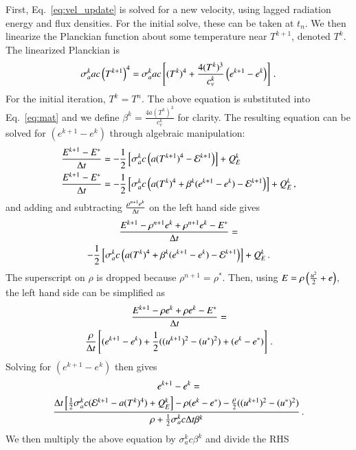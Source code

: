First, Eq.~\eqref{eq:vel_update} is solved for a new velocity, using lagged
radiation energy and flux densities.  For the initial solve, these can be taken
at $t_n$.  We then linearize the Planckian function about some temperature near
$T^{k+1}$, denoted $T^k$. The linearized Planckian is
\begin{equation}
  \sigma_a^k a c \left( T^{k+1} \right)^4 = 
  \sigma_a^k a c \left[(T^k)^4 + \frac{4(T^k)^3}{c_v^k}\left(
  e^{k+1} - e^{k}  \right)\right] \, .
    \label{eq:linearize}
\end{equation}
For the initial iteration, $T^k=T^n$.  The above equation is substituted into
Eq.~\eqref{eq:mat} and we define $\beta^k=\frac{4a(T^k)^3}{c_v^k}$ for clarity.
The resulting equation can be solved for $(e^{k+1} - e^{k})$ through
algebraic manipulation:
\begin{align*}
   \frac{E^{k+1} - E^*}{\Delta t} &= - \frac{1}{2}\left[\sigma_a^k c \left(
   a(T^{k+1})^4 - \mathcal{E}^{k+1}\right)\right]+Q_E^k \\
   \frac{E^{k+1} - E^*}{\Delta t} &= - \frac{1}{2}\left[\sigma_a^k c \left(
   a(T^k)^4 + \beta^k(e^{k+1} - e^k)  - \mathcal{E}^{k+1}\right)\right]+Q_E^k \, ,
\end{align*}
and adding and subtracting $\frac{\rho^{n+1}e^k}{\Delta t}$ on the left hand side gives
\begin{multline*}
   \frac{E^{k+1}-\rho^{n+1} e^k + \rho^{n+1} e^k - E^*}{\Delta t} = \\
   -\frac{1}{2}\left[\sigma_a^{k}c\left(
   a(T^k)^4 + \beta^k(e^{k+1} - e^k)  - \mathcal{E}^{k+1}\right)\right]+Q_E^k \, .
\end{multline*}
The superscript on $\rho$ is dropped because $\rho^{n+1} = \rho^*$. Then, using
$E=\rho\left( \frac{u^2}{2} + e \right)$, the left hand side can be simplified as 
\begin{multline} 
   \frac{E^{k+1} - \rho e^k + \rho e^k - E^*}{\Delta t} =\\
   \frac{\rho}{\Delta t}\left[(e^{k+1} - e^{k}) + \frac{1}{2}((u^{k+1})^2-(u^*)^2) +
   (e^k-e^*) \right] \, .
\end{multline}
Solving for $(e^{k+1} - e^{k})$ then gives
\begin{multline}
    e^{k+1}-e^k=\\
    \frac{{\Delta t}\left[ \frac{1}{2}\sigma_a^k c (\mathcal{E}^{k+1} -
    a(T^k)^4)+Q_E^k \right]- \rho(e^k-e^*)-
    \frac{\rho}{2}((u^{k+1})^2-(u^*)^2)}
    {\rho +\frac{1}{2}\sigma_a^k c \Delta t\beta^k} \, .
\label{eq:energy_update}
\end{multline}
We then multiply the above equation by $\sigma_a^k c \beta^k$ and divide the RHS
